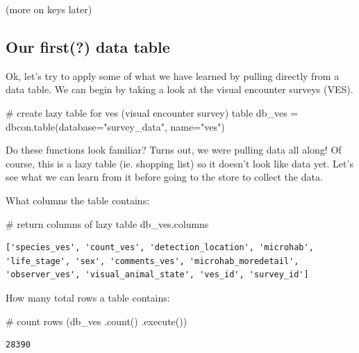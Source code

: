 \documentclass[
  letterpaper,
  DIV=11,
  numbers=noendperiod]{scrartcl}
\newenvironment{Shaded}{\begin{snugshade}}{\end{snugshade}}
\newcommand{\CommentTok}[1]{\textcolor[rgb]{0.37,0.37,0.37}{#1}}
\newcommand{\NormalTok}[1]{\textcolor[rgb]{0.00,0.23,0.31}{#1}}
\newcommand{\OperatorTok}[1]{\textcolor[rgb]{0.37,0.37,0.37}{#1}}
\newcommand{\StringTok}[1]{\textcolor[rgb]{0.13,0.47,0.30}{#1}}
\begin{document}
(more on keys later)

\subsection{Our first(?) data table}\label{our-first-data-table-1}

Ok, let's try to apply some of what we have learned by pulling directly
from a data table. We can begin by taking a look at the visual encounter
surveys (VES).

\begin{Shaded}
\begin{Highlighting}[]
\CommentTok{\# create lazy table for ves (visual encounter survey) table}
\NormalTok{db\_ves }\OperatorTok{=}\NormalTok{ dbcon.table(database}\OperatorTok{=}\StringTok{"survey\_data"}\NormalTok{, name}\OperatorTok{=}\StringTok{"ves"}\NormalTok{)}
\end{Highlighting}
\end{Shaded}

Do these functions look familiar? Turns out, we were pulling data all
along! Of course, this is a lazy table (ie. shopping list) so it doesn't
look like data yet. Let's see what we can learn from it before going to
the store to collect the data.

What columns the table contains:

\begin{Shaded}
\begin{Highlighting}[]
\CommentTok{\# return columns of lazy table}
\NormalTok{db\_ves.columns}
\end{Highlighting}
\end{Shaded}

\begin{verbatim}
['species_ves', 'count_ves', 'detection_location', 'microhab', 'life_stage', 'sex', 'comments_ves', 'microhab_moredetail', 'observer_ves', 'visual_animal_state', 'ves_id', 'survey_id']
\end{verbatim}

How many total rows a table contains:

\begin{Shaded}
\begin{Highlighting}[]
\CommentTok{\# count rows}
\NormalTok{(db\_ves}
\NormalTok{ .count()}
\NormalTok{ .execute())}
\end{Highlighting}
\end{Shaded}

\begin{verbatim}
28390
\end{verbatim}
\end{document}
